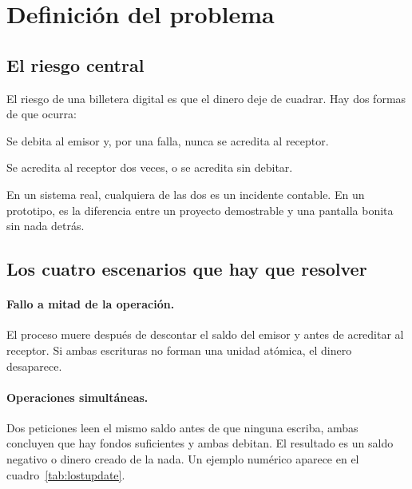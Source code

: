 \section{Definición del problema}
\label{sec:problema}

\subsection{El riesgo central}

El riesgo de una billetera digital es que el dinero deje de cuadrar. Hay dos
formas de que ocurra:

\begin{description}[leftmargin=2.6cm,style=nextline]
  \item[Pérdida de dinero] Se debita al emisor y, por una falla, nunca se
    acredita al receptor.
  \item[Creación de dinero] Se acredita al receptor dos veces, o se acredita
    sin debitar.
\end{description}

En un sistema real, cualquiera de las dos es un incidente contable. En un
prototipo, es la diferencia entre un proyecto demostrable y una pantalla
bonita sin nada detrás.

\subsection{Los cuatro escenarios que hay que resolver}

\paragraph{Fallo a mitad de la operación.} El proceso muere después de
descontar el saldo del emisor y antes de acreditar al receptor. Si ambas
escrituras no forman una unidad atómica, el dinero desaparece.

\paragraph{Operaciones simultáneas.} Dos peticiones leen el mismo saldo antes
de que ninguna escriba, ambas concluyen que hay fondos suficientes y ambas
debitan. El resultado es un saldo negativo o dinero creado de la nada. Un
ejemplo numérico aparece en el cuadro~\ref{tab:lostupdate}.

